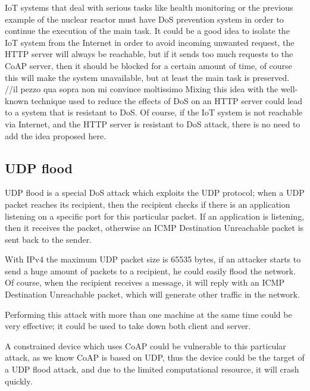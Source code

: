 	IoT systems that deal with serious tasks like health monitoring or the previous example of the nuclear reactor must have DoS prevention system in order to continue the execution of the main task.\newline
	It could be a good idea to isolate the IoT system from the Internet in order to avoid incoming unwanted request, the HTTP server will always be reachable, but if it sends too much requests to the CoAP server, then it should be blocked for a certain amount of time, of course this will make the system unavailable, but at least the main task is preserved.\newline
	//il pezzo qua sopra non mi convince moltissimo
	Mixing this idea with the well-known technique used to reduce the effects of DoS on an HTTP server could lead to a system that is resistant to DoS.\newline
	Of course, if the IoT system is not reachable via Internet, and the HTTP server is resistant to DoS attack, there is no need to add the idea proposed here.\newline
	
	\subsection{UDP flood}
	UDP flood is a special DoS attack which exploits the UDP protocol; when a UDP packet reaches its recipient, then the recipient checks if there is an application listening on a specific port for this particular packet.\newline
	If an application is listening, then it receives the packet, otherwise an ICMP Destination Unreachable packet is sent back to the sender.\newline
	
	With IPv4 the maximum UDP packet size is 65535 bytes, if an attacker starts to send a huge amount of packets to a recipient, he could easily flood the network.\newline
	Of course, when the recipient receives a message, it will reply with an ICMP Destination Unreachable packet, which will generate other traffic in the network.\newline
	
	Performing this attack with more than one machine at the same time could be very effective; it could be used to take down both client and server.\newline
	
	A constrained device which uses CoAP could be vulnerable to this particular attack, as we know CoAP is based on UDP, thus the device could be the target of a UDP flood attack, and due to the limited computational resource, it will crash quickly.\newline
	
